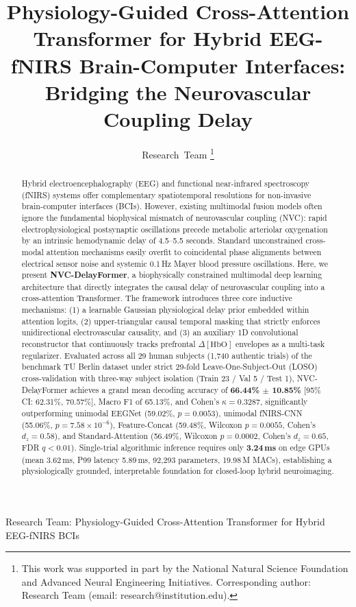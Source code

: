 \documentclass[journal]{IEEEtran}
\begin{document}
\title{Physiology-Guided Cross-Attention Transformer for Hybrid EEG-fNIRS Brain-Computer Interfaces: Bridging the Neurovascular Coupling Delay}

\author{Research~Team
\thanks{This work was supported in part by the National Natural Science Foundation and Advanced Neural Engineering Initiatives. Corresponding author: Research Team (email: research@institution.edu).}}

%
{Research Team: Physiology-Guided Cross-Attention Transformer for Hybrid EEG-fNIRS BCIs}

\maketitle

\begin{abstract}
Hybrid electroencephalography (EEG) and functional near-infrared spectroscopy (fNIRS) systems offer complementary spatiotemporal resolutions for non-invasive brain-computer interfaces (BCIs). However, existing multimodal fusion models often ignore the fundamental biophysical mismatch of neurovascular coupling (NVC): rapid electrophysiological postsynaptic oscillations precede metabolic arteriolar oxygenation by an intrinsic hemodynamic delay of 4.5--5.5 seconds. Standard unconstrained cross-modal attention mechanisms easily overfit to coincidental phase alignments between electrical sensor noise and systemic 0.1\,Hz Mayer blood pressure oscillations. Here, we present \textbf{NVC-DelayFormer}, a biophysically constrained multimodal deep learning architecture that directly integrates the causal delay of neurovascular coupling into a cross-attention Transformer. The framework introduces three core inductive mechanisms: (1) a learnable Gaussian physiological delay prior embedded within attention logits, (2) upper-triangular causal temporal masking that strictly enforces unidirectional electrovascular causality, and (3) an auxiliary 1D convolutional reconstructor that continuously tracks prefrontal $\Delta[\text{HbO}]$ envelopes as a multi-task regularizer. Evaluated across all 29 human subjects (1,740 authentic trials) of the benchmark TU Berlin dataset under strict 29-fold Leave-One-Subject-Out (LOSO) cross-validation with three-way subject isolation (Train 23 / Val 5 / Test 1), NVC-DelayFormer achieves a grand mean decoding accuracy of \textbf{66.44\% $\pm$ 10.85\%} [95\% CI: 62.31\%, 70.57\%], Macro F1 of 65.13\%, and Cohen's $\kappa = 0.3287$, significantly outperforming unimodal EEGNet (59.02\%, $p = 0.0053$), unimodal fNIRS-CNN (55.06\%, $p = 7.58 \times 10^{-6}$), Feature-Concat (59.48\%, Wilcoxon $p=0.0055$, Cohen's $d_z = 0.58$), and Standard-Attention (56.49\%, Wilcoxon $p=0.0002$, Cohen's $d_z = 0.65$, FDR $q < 0.01$). Single-trial algorithmic inference requires only \textbf{3.24\,ms} on edge GPUs (mean 3.62\,ms, P99 latency 5.89\,ms, 92,293 parameters, 19.98\,M MACs), establishing a physiologically grounded, interpretable foundation for closed-loop hybrid neuroimaging.
\end{abstract}
\end{document}
